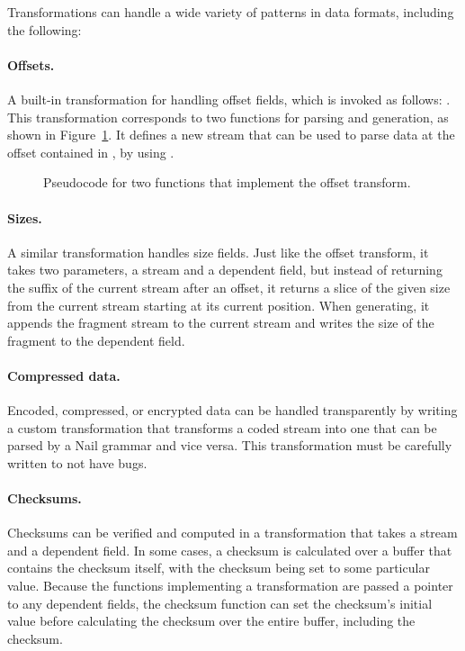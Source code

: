 Transformations can handle a wide variety of patterns in data formats, including the following: 
\paragraph{Offsets.}
A built-in transformation for handling offset fields, which is invoked as follows:
. 
This transformation corresponds to two functions for parsing and
generation, as shown in Figure~\ref{fig:xform-sig}. It defines a new stream  that can
be used to parse data at the offset contained in , by
using .

\begin{figure}[h]
\smaller[0.5]

\caption{Pseudocode for two functions that implement the offset transform.}
\label{fig:xform-sig}
\end{figure}


\paragraph{Sizes.}
A similar transformation handles size fields. Just like the offset transform, it takes two parameters, a
stream and a dependent field, but instead of returning the suffix of the current stream after an
offset, it returns a slice of the given size from the current stream starting at its current
position. When generating, it appends the fragment stream to the current stream and writes the size
of the fragment to the dependent field.

\paragraph{Compressed data.}
Encoded, compressed, or encrypted data can be handled transparently by writing a custom
transformation that transforms a coded stream into one that can be parsed by a Nail grammar and vice
versa. This transformation must be carefully written to not have bugs.

\paragraph{Checksums.}
Checksums can be verified and computed in a transformation that takes a stream and a dependent
field. In some cases, a checksum is calculated over a buffer that contains the checksum itself, with
the checksum being set to some particular value. Because the functions implementing a transformation
are passed a pointer to any dependent fields, the checksum function can set the checksum's initial
value before calculating the checksum over the entire buffer, including the checksum.


